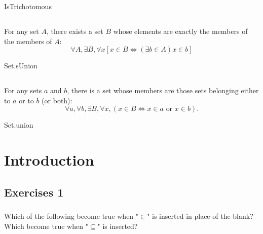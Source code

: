 \documentclass{report}
\begin{document}
    {IsTrichotomous}

\section{}%

  For any set $A$, there exists a set $B$ whose elements are exactly the members
    of the members of $A$:
    $$\forall A, \exists B, \forall x
      \left[ x \in B \iff (\exists b \in A) x \in b \right]$$

    {Set.sUnion}

\section{}%

  For any sets $a$ and $b$, there is a set whose members are those sets
    belonging either to $a$ or to $b$ (or both):
    $$\forall a, \forall b, \exists B, \forall x,
        (x \in B \iff x \in a \text{ or } x \in b).$$

    {Set.union}

\endgroup

\chapter{Introduction}%

\section{Exercises 1}%

\subsection{}%

  Which of the following become true when "$\in$" is inserted in place of the
    blank?
  Which become true when "$\subseteq$" is inserted?

\subsubsection{}%
\end{document}

